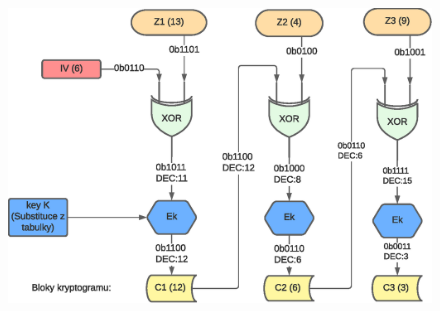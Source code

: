 \documentclass[10pt, a4paper]{article}%
\begin{document}
\begin{enumerate}
		\begin{figure}[ht!]
			\centering
			\includegraphics[width = 1\textwidth]{CBC_drawing.eps}
		\end{figure}
 	
	\end{enumerate}
\clearpage
\end{document}
